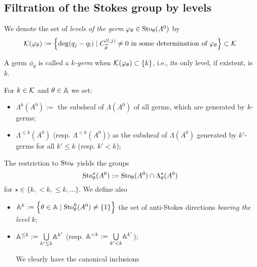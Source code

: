 \subsection{Filtration of the Stokes group by levels}
We denote the set of \emph{levels of the germ}
$\varphi_{\theta}\in\operatorname{Sto}_\theta(A^0)$ by
\[
  \mathcal{K}(\varphi_\theta):= \left\{\deg(q_j-q_l)\mid C_{\widetilde\theta}^{(l,j)}\neq0
    \text{ in some determination of }\varphi_\theta\right\} \subset \mathcal{K}
\]
\begin{defn}
  A germ $\phi_\theta$ is called a \emph{$k$-germ} when
  $\mathcal{K}(\varphi_{\theta})\subset\{k\}$, i.e., its only level, if existent, is $k$.
\end{defn}

\begin{notations}
  For $k\in\mathcal{K}$ and $\theta\in\mathbb{A}$ we set:
  \begin{itemize}
    \item $\Lambda^{k}(A^0):=$ the subsheaf of $\Lambda(A^0)$ of all germs,
      which are generated by $k$-germs;
    \item $\Lambda^{\leq k}(A^0)$ (resp. $\Lambda^{<k}(A^0)$) as the subsheaf
      of $\Lambda(A^0)$ generated by $k'$-germs for all $k'\leq k$ (resp.
      $k'<k$);
  \end{itemize}
  The restriction to $\operatorname{Sto}_\theta$ yields the groups
  \[
    \operatorname{Sto}_\theta^\star(A^0):=\operatorname{Sto}_\theta(A^0)\cap\Lambda_\theta^{\star}(A^0)
  \]
  for $\star\in\{k,<k,\leq k,\dots\}$.
  We define also
  \begin{itemize}
    \item $\mathbb{A}^k:=\left\{\theta\in\mathbb{A}\mid\operatorname{Sto}_\theta^k(A^0)\neq\{1\}\right\}$ the
      set of anti-Stokes directions \emph{bearing the level $k$};
    \item $\mathbb{A}^{\leq k}:=\underset{k'\leq k}\bigcup\mathbb{A}^{k'}$ (resp.
      $\mathbb{A}^{<k}:=\underset{k'<k}\bigcup\mathbb{A}^{k'}$);
      \begin{s-rem}
        We clearly have the canonical inclusions

\end{s-rem}
\end{itemize}
\end{notations}
